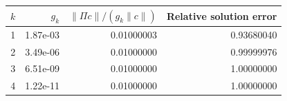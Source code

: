 \begin{tabular}{rrrr}
\toprule
$k$ & $g_k$ & $\|\Pi c\|/(g_k\|c\|)$ & Relative solution error\\
\midrule
1 & 1.87e-03 & 0.01000003 & 0.93680040 \\
2 & 3.49e-06 & 0.01000000 & 0.99999976 \\
3 & 6.51e-09 & 0.01000000 & 1.00000000 \\
4 & 1.22e-11 & 0.01000000 & 1.00000000 \\
\bottomrule
\end{tabular}
